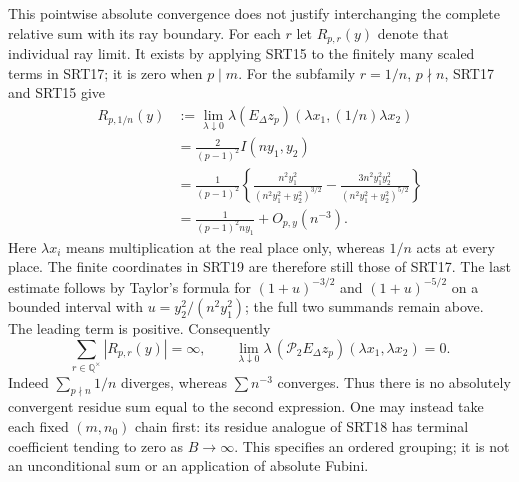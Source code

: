 This pointwise absolute convergence does not justify interchanging
the complete relative sum with its ray boundary. For each $r$ let
$R_{p,r}(y)$ denote that individual ray limit. It exists by applying
SRT15 to the finitely many scaled terms in SRT17; it is zero when
$p\mid m$. For the subfamily
$r=1/n$, $p\nmid n$, SRT17 and SRT15 give
\begin{equation}\tag{SRT19}
\begin{split}
R_{p,1/n}(y)
&:=\lim_{\lambda\downarrow0}\lambda
     (E_\Delta z_p)(\lambda x_1,(1/n)\lambda x_2)\\
&=\frac{2}{(p-1)^2}I(ny_1,y_2)\\
&=\frac1{(p-1)^2}
 \left\{\frac{n^2y_1^2}{(n^2y_1^2+y_2^2)^{3/2}}
 -\frac{3n^2y_1^2y_2^2}{(n^2y_1^2+y_2^2)^{5/2}}\right\}\\
&=\frac1{(p-1)^2 n y_1}+O_{p,y}(n^{-3}).
\end{split}
\end{equation}
Here $\lambda x_i$ means multiplication at the real place only,
whereas $1/n$ acts at every place. The finite coordinates in SRT19
are therefore still those of SRT17. The last estimate follows by
Taylor's formula for $(1+u)^{-3/2}$ and $(1+u)^{-5/2}$ on a bounded
interval with $u=y_2^2/(n^2y_1^2)$; the full two summands remain above.
The leading term is positive. Consequently
\begin{equation}\tag{SRT20}
\sum_{r\in\mathbb Q^\times}|R_{p,r}(y)|=\infty,
\qquad
\lim_{\lambda\downarrow0}\lambda\,
       (\mathcal P_2E_\Delta z_p)(\lambda x_1,\lambda x_2)=0.
\end{equation}
Indeed $\sum_{p\nmid n}1/n$ diverges, whereas $\sum n^{-3}$
converges. Thus there is no absolutely convergent residue sum equal
to the second expression. One may instead take each fixed
$(m,n_0)$ chain first: its residue analogue of SRT18 has terminal
coefficient tending to zero as $B\to\infty$. This specifies an
ordered grouping; it is not an unconditional sum or an application
of absolute Fubini.

